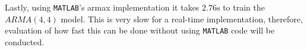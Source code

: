 \documentclass[letter, 10pt, journal]{elsarticle}
\theoremstyle{definition}
\begin{document}
Lastly, using \texttt{MATLAB}'s armax implementation it takes $2.76\si{\second}$ to train the $ARMA(4,4)$ model. This is very slow for a real-time implementation, therefore, evaluation of how fast this can be done without using \texttt{MATLAB} code will be conducted. 


\balance

%
\end{document}
